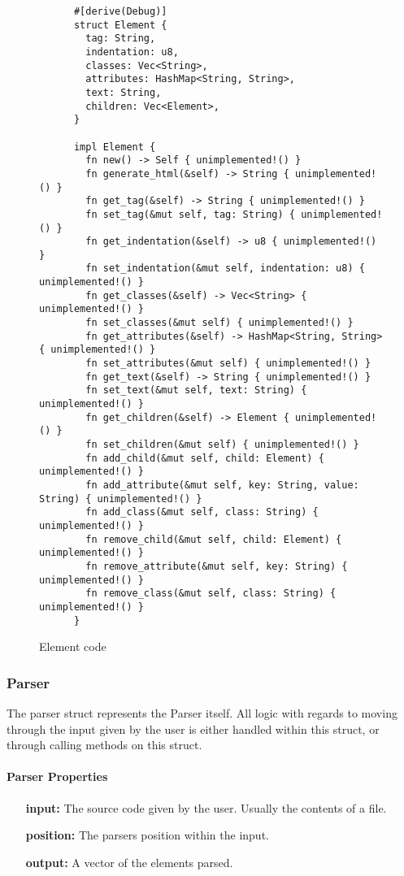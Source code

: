 \begin{figure}[ht!]
    \begin{verbatim}
      #[derive(Debug)]
      struct Element {
        tag: String,
        indentation: u8,
        classes: Vec<String>,
        attributes: HashMap<String, String>,
        text: String,
        children: Vec<Element>,
      }

      impl Element {
        fn new() -> Self { unimplemented!() }
        fn generate_html(&self) -> String { unimplemented!() }
        fn get_tag(&self) -> String { unimplemented!() }
        fn set_tag(&mut self, tag: String) { unimplemented!() }
        fn get_indentation(&self) -> u8 { unimplemented!() }
        fn set_indentation(&mut self, indentation: u8) { unimplemented!() }
        fn get_classes(&self) -> Vec<String> { unimplemented!() }
        fn set_classes(&mut self) { unimplemented!() }
        fn get_attributes(&self) -> HashMap<String, String> { unimplemented!() }
        fn set_attributes(&mut self) { unimplemented!() }
        fn get_text(&self) -> String { unimplemented!() }
        fn set_text(&mut self, text: String) { unimplemented!() }
        fn get_children(&self) -> Element { unimplemented!() }
        fn set_children(&mut self) { unimplemented!() }
        fn add_child(&mut self, child: Element) { unimplemented!() }
        fn add_attribute(&mut self, key: String, value: String) { unimplemented!() }
        fn add_class(&mut self, class: String) { unimplemented!() }
        fn remove_child(&mut self, child: Element) { unimplemented!() }
        fn remove_attribute(&mut self, key: String) { unimplemented!() }
        fn remove_class(&mut self, class: String) { unimplemented!() }
      }
    \end{verbatim}
    \caption{Element code}
\end{figure}

\subsubsection{Parser}
The parser struct represents the Parser itself. All logic with regards to moving through the input given by the user is either handled within this struct, or through calling methods on this struct.

\paragraph{Parser Properties}
\begin{itemize}
    \item[\textbf{input:}] The source code given by the user. Usually the contents of a file.
    \item[\textbf{position:}] The parsers position within the input. 
    \item[\textbf{output:}] A vector of the elements parsed.
\end{itemize}

